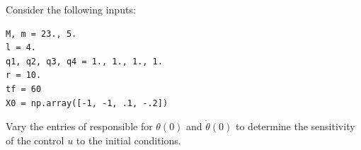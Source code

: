 \begin{problem}
Consider the following inputs: 
\begin{lstlisting}
M, m = 23., 5.
l = 4.
q1, q2, q3, q4 = 1., 1., 1., 1.
r = 10.
tf = 60
X0 = np.array([-1, -1, .1, -.2])
\end{lstlisting}
Vary the entries of  responsible for $\theta(0)$ and $\dot{\theta}(0)$ to determine the sensitivity of the control $u$ to the initial conditions.
\end{problem}

%
%
%
%
%
%


